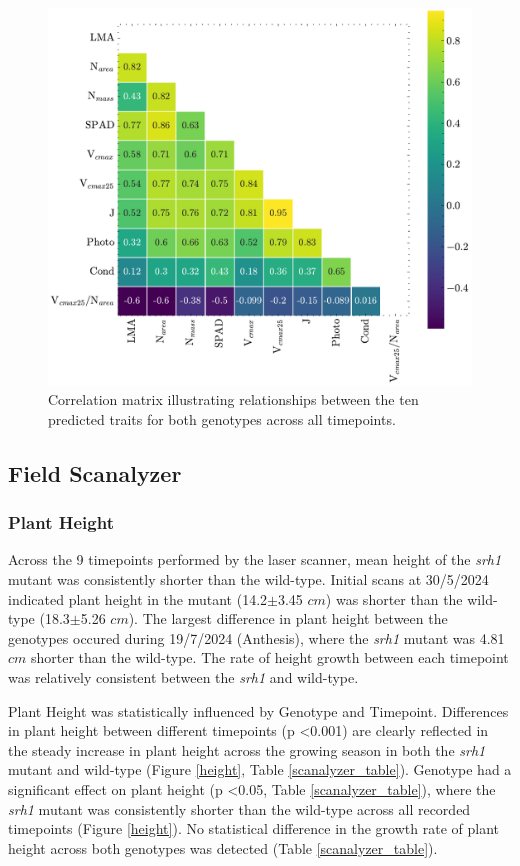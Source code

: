 \documentclass{article}
\begin{document}
\begin{figure}[ht]
	\centering
	\includegraphics[width=\textwidth]{Correlation Matrix.pdf}
	\caption{Correlation matrix illustrating relationships between the ten predicted traits for both genotypes across all timepoints.}
	\label{correlation_matrix}
\end{figure}




\subsection{Field Scanalyzer}
\subsubsection{Plant Height}
Across the 9 timepoints performed by the laser scanner, mean height of the
\textit{srh1} mutant was consistently shorter than the wild-type. Initial
scans at 30/5/2024 indicated plant height in the mutant (14.2$\pm$3.45 $cm$) was
shorter than the wild-type (18.3$\pm$5.26 $cm$). The largest difference in plant
height between the genotypes occured during 19/7/2024 (Anthesis), where the
\textit{srh1} mutant was 4.81 $cm$ shorter than the wild-type. The rate of height
growth between each timepoint was relatively consistent between the \textit{srh1}
and wild-type.

Plant Height was statistically influenced by Genotype and Timepoint. Differences
in plant height between different timepoints (p \textless 0.001) are clearly reflected
in the steady increase in plant height across the growing season in both the
\textit{srh1} mutant and wild-type (Figure \ref{height}, Table
\ref{scanalyzer_table}). Genotype had a significant effect on plant height (p
\textless 0.05, Table \ref{scanalyzer_table}), where the \textit{srh1} mutant was consistently
shorter than the wild-type across all recorded timepoints (Figure
\ref{height}). No statistical difference in the growth rate of plant height
across both genotypes was detected (Table \ref{scanalyzer_table}).
\end{document}

